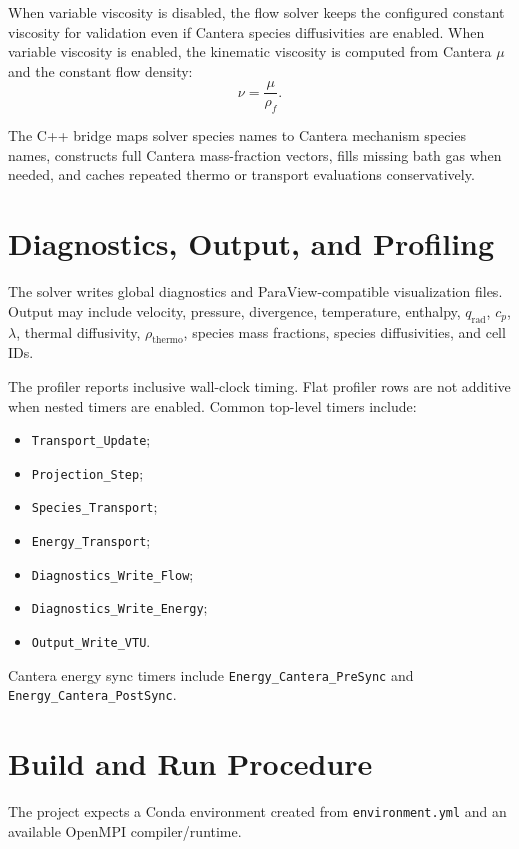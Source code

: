 \documentclass[11pt]{article}
\begin{document}
When variable viscosity is disabled, the flow solver keeps the configured
constant viscosity for validation even if Cantera species diffusivities are
enabled.  When variable viscosity is enabled, the kinematic viscosity is
computed from Cantera \(\mu\) and the constant flow density:
\begin{equation}
  \nu = \frac{\mu}{\rho_f}.
\end{equation}

The C++ bridge maps solver species names to Cantera mechanism species names,
constructs full Cantera mass-fraction vectors, fills missing bath gas when
needed, and caches repeated thermo or transport evaluations conservatively.

\section{Diagnostics, Output, and Profiling}

The solver writes global diagnostics and ParaView-compatible visualization
files.  Output may include velocity, pressure, divergence, temperature,
enthalpy, \(q_{\mathrm{rad}}\), \(c_p\), \(\lambda\), thermal diffusivity,
\(\rho_{\mathrm{thermo}}\), species mass fractions, species diffusivities, and
cell IDs.

The profiler reports inclusive wall-clock timing.  Flat profiler rows are not
additive when nested timers are enabled.  Common top-level timers include:
\begin{itemize}[leftmargin=*]
  \item \texttt{Transport\_Update};
  \item \texttt{Projection\_Step};
  \item \texttt{Species\_Transport};
  \item \texttt{Energy\_Transport};
  \item \texttt{Diagnostics\_Write\_Flow};
  \item \texttt{Diagnostics\_Write\_Energy};
  \item \texttt{Output\_Write\_VTU}.
\end{itemize}
Cantera energy sync timers include \texttt{Energy\_Cantera\_PreSync} and
\texttt{Energy\_Cantera\_PostSync}.

\section{Build and Run Procedure}

The project expects a Conda environment created from \texttt{environment.yml}
and an available OpenMPI compiler/runtime.
\end{document}
